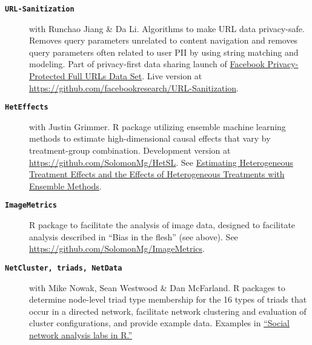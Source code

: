 \documentclass[letterpaper,11pt]{article}
\newcommand{\resheading}[1]{\vspace{4pt}{\large
\colorbox{mygrey}{\begin{minipage}{\textwidth}{\textbf{#1
\vphantom{p\^{E}}}}\end{minipage}}}\vspace{4pt}}
\begin{document}
\vspace{0.1in}

\resheading{Software}
 
\begin{description}

\item[\large{\textbf{\texttt{URL-Sanitization}}}] with Runchao Jiang \& Da Li. Algorithms to make URL data privacy-safe. Removes query parameters unrelated to content navigation and removes query parameters often related to user PII by using string matching and modeling. Part of privacy-first data sharing launch of \href{https://solomonmg.github.io/pdf/Facebook_DP_URLs_Dataset.pdf}{Facebook Privacy-Protected Full URLs Data Set}. Live version at \url{https://github.com/facebookresearch/URL-Sanitization}.

\item[\large{\textbf{\texttt{HetEffects}}}] with Justin Grimmer. R package utilizing ensemble machine learning methods to estimate high-dimensional causal effects that vary by treatment-group combination. Development version at \url{https://github.com/SolomonMg/HetSL}. See \href{http://stanford.edu/~jgrimmer/het.pdf}{Estimating Heterogeneous Treatment Effects and the Effects of Heterogeneous Treatments with Ensemble Methods}.

\item[\large{\textbf{\texttt{ImageMetrics}}}] R package to facilitate the analysis of image data,
designed to facilitate analysis described in ``Bias in the flesh'' (see above). See \url{https://github.com/SolomonMg/ImageMetrics}.


\item[\large{\textbf{\texttt{NetCluster, triads, NetData}}}] with Mike Nowak, Sean Westwood \& Dan McFarland. R packages to determine node-level triad type membership for the 16 types of triads that occur in a directed network, facilitate network clustering and evaluation of cluster configurations, and provide example data.  Examples in \href{http://sna.stanford.edu/rlabs.php}{``Social network analysis labs in R.''} 

%


\end{description}
\end{document}
